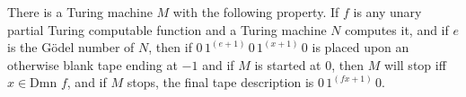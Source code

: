 There is a Turing machine $M$ with the following property. If $f$ is any unary partial Turing computable function and a Turing machine $N$ computes it, and if $e$ is the Gödel number of $N$, then if $0 \, 1^{(e+1)} \, 0 \, 1^{(x+1)} \, 0$ is placed upon an otherwise blank tape ending at $-1$ and if $M$ is started at $0$, then $M$ will stop iff $x \in \text{Dmn } f$, and if $M$ stops, the final tape description is $0 \, 1^{(fx+1)} \, 0$.
